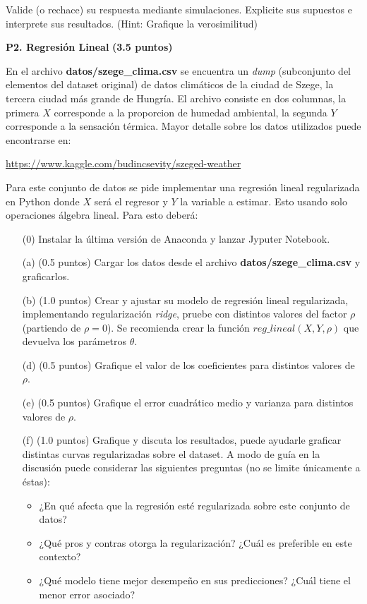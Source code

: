 \documentclass[11pt,letterpaper]{article}
\begin{document}
Valide (o rechace) su respuesta mediante simulaciones. Explicite sus supuestos e interprete sus resultados. (Hint: Grafique la verosimilitud)


\vspace{5 mm}
\noindent\textbf{P2. Regresión Lineal} \textbf{(3.5 puntos)}
\vspace{5 mm}

En el archivo \textbf{datos/szege\_clima.csv} se encuentra un \emph{dump} (subconjunto del  elementos del dataset original) de datos climáticos de la ciudad de Szege, la tercera ciudad más grande de Hungría. El archivo consiste en dos columnas, la primera $X$ corresponde a la proporcion de humedad ambiental, la segunda $Y$ corresponde a la sensación térmica. Mayor detalle sobre los datos utilizados puede encontrarse en:

\vspace{1em}
\centerline{\url{https://www.kaggle.com/budincsevity/szeged-weather}}
\vspace{1em}

Para este conjunto de datos se pide implementar una regresión lineal regularizada en Python donde $X$ será el regresor y $Y$ la variable a estimar. Esto usando solo operaciones álgebra lineal.
Para esto deberá:
\begin{itemize}
	\item[(0)] Instalar la última versión de Anaconda y lanzar Jyputer Notebook.
	\item[(a)] (0.5 puntos) Cargar los datos desde el archivo \textbf{datos/szege\_clima.csv} y graficarlos.
	\item[(b)] (1.0 puntos) Crear y ajustar su modelo de regresión lineal regularizada, implementando regularización \emph{ridge}, pruebe con distintos valores del factor $\rho$ (partiendo de $\rho=0$). Se recomienda crear la función $reg\_lineal(X,Y,\rho)$ que devuelva los parámetros $\theta$.
	\item[(d)] (0.5 puntos) Grafique el valor de los coeficientes para distintos valores de $\rho$.
	\item[(e)] (0.5 puntos) Grafique el error cuadrático medio y varianza para distintos valores de $\rho$.
	\item[(f)] (1.0 puntos) Grafique y discuta los resultados, puede ayudarle graficar distintas curvas regularizadas sobre el dataset. A modo de guía en la discusión puede considerar las siguientes preguntas (no se limite únicamente a éstas):
	    \begin{itemize}
	        \item ¿En qué afecta que la regresión esté regularizada sobre este conjunto de datos?
	        \item ¿Qué pros y contras otorga la regularización? ¿Cuál es preferible en este contexto?
	        \item ¿Qué modelo tiene mejor desempeño en sus predicciones? ¿Cuál tiene el menor error asociado?
	    \end{itemize}
\end{itemize}
\end{document}
